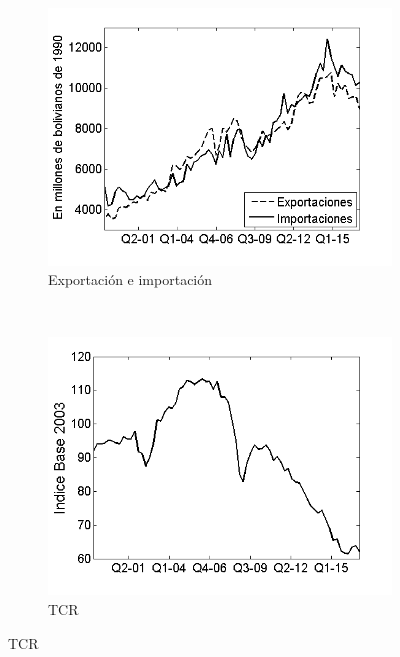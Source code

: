 \documentclass[12pt,letterpaper]{article}
\begin{document}
\begin{figure}
\centering
\caption{Variables incluidas en el modelo}\label{variables}
    \begin{subfigure}[b]{0.4\textwidth}
        \includegraphics[width=\textwidth]{1xm}
        \caption{Exportación e importación}
        \label{1xm}
    \end{subfigure}
    ~ %
    \begin{subfigure}[b]{0.4\textwidth}
        \includegraphics[width=\textwidth]{3tcr}
        \caption{TCR}
        \label{3tcr}

\end{subfigure}
\end{figure}
\end{document}
